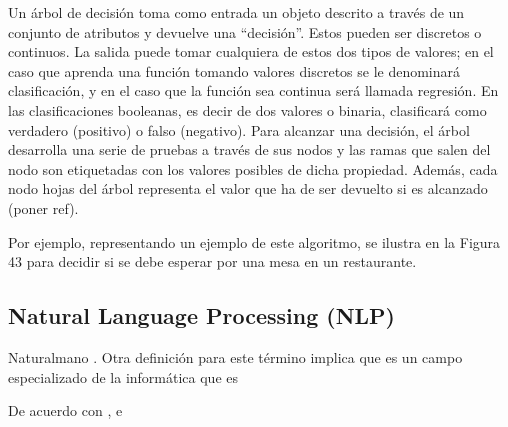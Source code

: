 \begin{itemize}
	Un árbol de decisión toma como entrada un objeto descrito a través de un conjunto de atributos y devuelve una “decisión”. Estos pueden ser discretos o continuos. La salida puede tomar cualquiera de estos dos tipos de valores; en el caso que aprenda una función tomando valores discretos se le denominará clasificación, y en el caso que la función sea continua será llamada regresión. En las clasificaciones booleanas, es decir de dos valores o binaria, clasificará como verdadero (positivo) o falso (negativo). Para alcanzar una decisión, el árbol desarrolla una serie de pruebas a través de sus nodos y las ramas que salen del nodo son etiquetadas con los valores posibles de dicha propiedad. Además, cada nodo hojas del árbol representa el valor que ha de ser devuelto si es alcanzado (poner ref).
	
	Por ejemplo, representando un ejemplo de este algoritmo, se ilustra en la Figura 43 para decidir si se debe esperar por una mesa en un restaurante.
\end{itemize}

\subsection{Natural Language Processing (NLP)}
 Naturalmano \parencite{bk_goyal2018deep}. Otra definición para este término implica que es un campo especializado de la informática que es

 De acuerdo con \citet{bk_goyal2018deep}, e
 